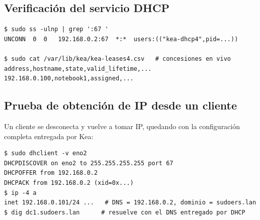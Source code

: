 \subsection{Verificación del servicio DHCP}

\begin{lstlisting}[style=terminal]
$ sudo ss -ulnp | grep ':67 '
UNCONN  0  0   192.168.0.2:67  *:*  users:(("kea-dhcp4",pid=...))

$ sudo cat /var/lib/kea/kea-leases4.csv   # concesiones en vivo
address,hostname,state,valid_lifetime,...
192.168.0.100,notebook1,assigned,...
\end{lstlisting}


\subsection{Prueba de obtención de IP desde un cliente}

Un cliente se desconecta y vuelve a tomar IP, quedando con la configuración
completa entregada por Kea:

\begin{lstlisting}[style=terminal]
$ sudo dhclient -v eno2
DHCPDISCOVER on eno2 to 255.255.255.255 port 67
DHCPOFFER from 192.168.0.2
DHCPACK from 192.168.0.2 (xid=0x...)
$ ip -4 a
inet 192.168.0.101/24 ...   # DNS = 192.168.0.2, dominio = sudoers.lan
$ dig dc1.sudoers.lan      # resuelve con el DNS entregado por DHCP
\end{lstlisting}

